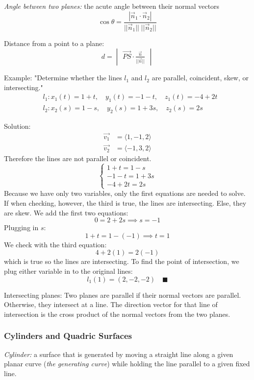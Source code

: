 \documentclass[12pt]{article}
\begin{document}
\emph{Angle between two planes:} the acute angle between their normal vectors
\[\cos \theta = \frac{|\vec{n}_1 \cdot \vec{n}_2|}{||\vec{n}_1|| \; ||\vec{n}_2||}\]

Distance from a point to a plane:
\[d = \begin{vmatrix}
    \vec{PS} \cdot \frac{\vec{n}}{||\vec{n}||}
\end{vmatrix}\]

Example: 
"Determine whether the lines $l_1$ and $l_2$ are parallel, coincident, skew, or intersecting."
\begin{align*}
    &l_1: x_1(t) = 1 + t, \quad y_1(t) = -1 - t, \quad z_1(t) = -4 +2t\\
    &l_2: x_2(s) = 1 - s, \quad y_2(s) = 1 + 3s, \quad z_2(s) = 2s
\end{align*}    

Solution:
\begin{align*}
    \vec{v_1} &= \langle 1, -1, 2\rangle\\
    \vec{v_2} &= \langle -1, 3, 2\rangle
\end{align*}
Therefore the lines are not parallel or coincident. 
\[\begin{cases}
    1 + t = 1 - s\\
    -1 - t = 1 +3s\\
    -4 + 2t = 2s
\end{cases}\]
Because we have only two variables, only the first equations are needed to solve. If when checking, however, the third is true, the lines are intersecting. Else, they are skew. 
We add the first two equations:
\[0 = 2 + 2s \implies s = -1\]
Plugging in $s$:
\[1 + t = 1 - (-1) \implies t = 1\]
We check with the third equation:
\[4 + 2(1) = 2(-1)\] which is true so the lines are intersecting. 
To find the point of intersection, we plug either variable in to the original lines:
\[l_1(1) = (2, -2, -2) \quad \blacksquare\]

Intersecting planes:
Two planes are parallel if their normal vectors are parallel. Otherwise, they intersect at a line. The direction vector for that line of intersection is the cross product of the normal vectors from the two planes. 

\subsubsection{Cylinders and Quadric Surfaces}
\emph{Cylinder:} a surface that is generated by moving a straight line along a given planar curve (\emph{the generating curve}) while holding the line parallel to a given fixed line. 
\end{document}
